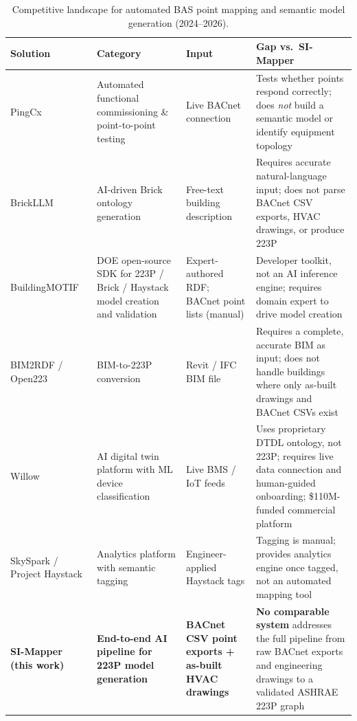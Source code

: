 \begin{table}[htbp]
\centering
\caption{Competitive landscape for automated BAS point mapping and semantic model generation (2024--2026).}
\label{tab:landscape}
\small
\begin{tabular}{p{3cm}p{3cm}p{3cm}p{4cm}}
\toprule
\textbf{Solution} & \textbf{Category} & \textbf{Input} & \textbf{Gap vs.\ SI-Mapper} \\
\midrule

PingCx~\cite{PingCx2024}
  & Automated functional commissioning \& point-to-point testing
  & Live BACnet connection
  & Tests whether points respond correctly; does \emph{not} build a semantic model or identify equipment topology \\
\addlinespace

BrickLLM~\cite{Perini2025}
  & AI-driven Brick ontology generation
  & Free-text building description
  & Requires accurate natural-language input; does not parse BACnet CSV exports, HVAC drawings, or produce 223P \\
\addlinespace

BuildingMOTIF~\cite{BuildingMOTIF_NREL}
  & DOE open-source SDK for 223P / Brick / Haystack model creation and validation
  & Expert-authored RDF; BACnet point lists (manual)
  & Developer toolkit, not an AI inference engine; requires domain expert to drive model creation \\
\addlinespace

BIM2RDF / Open223~\cite{Open223}
  & BIM-to-223P conversion
  & Revit / IFC BIM file
  & Requires a complete, accurate BIM as input; does not handle buildings where only as-built drawings and BACnet CSVs exist \\
\addlinespace

Willow~\cite{Willow2025}
  & AI digital twin platform with ML device classification
  & Live BMS / IoT feeds
  & Uses proprietary DTDL ontology, not 223P; requires live data connection and human-guided onboarding; \$110M-funded commercial platform \\
\addlinespace

SkySpark / Project Haystack~\cite{SkySpark}
  & Analytics platform with semantic tagging
  & Engineer-applied Haystack tags
  & Tagging is manual; provides analytics engine once tagged, not an automated mapping tool \\
\addlinespace

\textbf{SI-Mapper (this work)}
  & \textbf{End-to-end AI pipeline for 223P model generation}
  & \textbf{BACnet CSV point exports + as-built HVAC drawings}
  & \textbf{No comparable system} addresses the full pipeline from raw BACnet exports and engineering drawings to a validated ASHRAE 223P graph \\

\bottomrule
\end{tabular}
\end{table}

